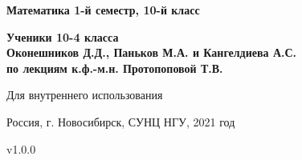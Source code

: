 \begin{titlepage}
    \begin{center}
        \vspace*{1cm}
            
        \Huge
        \textbf{Математика 1-й семестр, 10-й класс}
            
        \vspace{5cm}
        
        \Large
        \textbf{Ученики 10-4 класса}\\
        \textbf{Оконешников Д.Д., Паньков М.А. и Кангелдиева А.С.}\\
        \textbf{по лекциям к.ф.-м.н. Протопоповой Т.В.}

        \vfill

        \vspace{0.8cm}

        \Large
        
        Для внутреннего использования
        
        Россия, г. Новосибирск, СУНЦ НГУ, 2021 год
        
        v1.0.0
            
    \end{center}
\end{titlepage}
\newpage

\tableofcontents
\thispagestyle{empty}
\setcounter{tocdepth}{5}
\newpage

